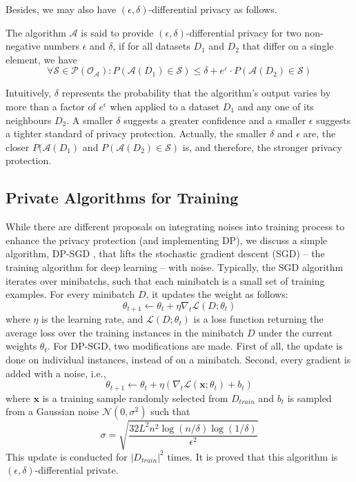 Besides, we may also have $(\epsilon,\delta)$-differential privacy as follows. 
\begin{definition}
The algorithm $\mathcal{A}$ is said to provide 
$(\epsilon,\delta)$-differential privacy for two non-negative numbers $\epsilon$ and $\delta$,  if for all datasets $D_1$ and $D_2$ that differ on a single element, we have 
\begin{equation}
    \forall \mathcal{S}\in \mathcal{P}(\mathcal{O}_{\mathcal{A}}):  P(\mathcal{A}(D_1) \in \mathcal{S}) \leq \delta + e^{\varepsilon} \cdot P(\mathcal{A}(D_2) \in \mathcal{S})
\end{equation}
\end{definition}

Intuitively, $\delta$ represents the probability that the algorithm's output varies by more than a factor of $e^{\epsilon}$ when applied to a dataset $D_1$ and any one of its neighbours $D_2$. A smaller $\delta$ suggests a greater confidence and a smaller $\epsilon$ suggests a tighter standard of privacy protection. Actually, the smaller $\delta$ and $\epsilon$ are,  the closer $P(\mathcal{A}(D_1)$ and $P(\mathcal{A}(D_2) \in \mathcal{S})$ is, and therefore, the stronger privacy protection. 

\subsection{Private Algorithms for Training}

While there are different proposals on integrating noises into training process to enhance the privacy protection (and implementing DP), we discuss a simple algorithm, DP-SGD \cite{DBLP:conf/focs/BassilyST14}, that lifts the stochastic gradient descent (SGD) -- the training algorithm for deep learning -- with noise. Typically, the SGD algorithm iterates over minibatchs, such that each minibatch is a small set of training examples. For every minibatch $D$, it updates the weight as follows: 
\begin{equation}
    \theta_{t+1} \leftarrow \theta_t + \eta \nabla_t \mathcal{L}(D;\theta_t)
\end{equation}
where $\eta$ is the learning rate, and $\mathcal{L}(D ;\theta_t)$ is a loss function returning the average loss over the training instances in the minibatch $D$ under the current weights $\theta_t$. For DP-SGD, two modifications are made. First of all, the update is done on individual instances, instead of on a minibatch. Second, every gradient is added with a noise, i.e., 
\begin{equation}
    \theta_{t+1} \leftarrow \theta_t + \eta( \nabla_t \mathcal{L}(\textbf{x};\theta_t)+ b_t)
\end{equation}
where $\textbf{x}$ is a training sample randomly selected from $D_{train}$ and $b_t$ is sampled from a Gaussian noise $\mathcal{N}(0,\sigma^2)$ such that 
\begin{equation}
    \sigma = \sqrt{\frac{32 L^2 n^2 \log(n/\delta)\log (1/\delta)}{\epsilon^2}}
\end{equation}
This update is conducted for $|D_{train}|^2$ times. 
It is proved \cite{DBLP:conf/focs/BassilyST14} that this algorithm is $(\epsilon,\delta)$-differential private. 

